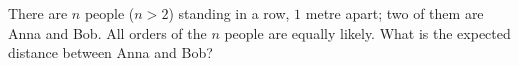 There are $n$ people ($n>2$) standing in a row, $1$ metre apart; two of them are Anna and Bob. All orders of the $n$ people are equally likely. What is the expected distance between Anna and Bob?

